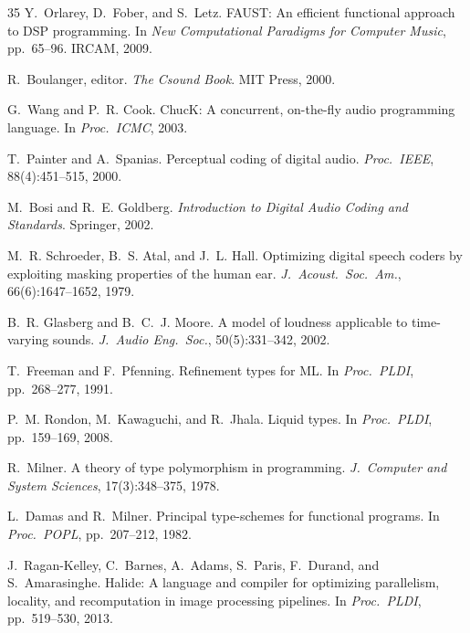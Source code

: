 \documentclass[sigchi, nonacm]{acmart}
\begin{document}
\begin{thebibliography}{35}
Y.~Orlarey, D.~Fober, and S.~Letz.
\newblock FAUST: An efficient functional approach to DSP programming.
\newblock In \emph{New Computational Paradigms for Computer Music}, pp.~65--96. IRCAM, 2009.

R.~Boulanger, editor.
\newblock \emph{The Csound Book}.
\newblock MIT Press, 2000.

G.~Wang and P.~R. Cook.
\newblock ChucK: A concurrent, on-the-fly audio programming language.
\newblock In \emph{Proc.\ ICMC}, 2003.

T.~Painter and A.~Spanias.
\newblock Perceptual coding of digital audio.
\newblock \emph{Proc.\ IEEE}, 88(4):451--515, 2000.

M.~Bosi and R.~E. Goldberg.
\newblock \emph{Introduction to Digital Audio Coding and Standards}.
\newblock Springer, 2002.

M.~R. Schroeder, B.~S. Atal, and J.~L. Hall.
\newblock Optimizing digital speech coders by exploiting masking properties of the human ear.
\newblock \emph{J.\ Acoust.\ Soc.\ Am.}, 66(6):1647--1652, 1979.

B.~R. Glasberg and B.~C.~J. Moore.
\newblock A model of loudness applicable to time-varying sounds.
\newblock \emph{J.\ Audio Eng.\ Soc.}, 50(5):331--342, 2002.

T.~Freeman and F.~Pfenning.
\newblock Refinement types for ML.
\newblock In \emph{Proc.\ PLDI}, pp.~268--277, 1991.

P.~M. Rondon, M.~Kawaguchi, and R.~Jhala.
\newblock Liquid types.
\newblock In \emph{Proc.\ PLDI}, pp.~159--169, 2008.

R.~Milner.
\newblock A theory of type polymorphism in programming.
\newblock \emph{J.\ Computer and System Sciences}, 17(3):348--375, 1978.

L.~Damas and R.~Milner.
\newblock Principal type-schemes for functional programs.
\newblock In \emph{Proc.\ POPL}, pp.~207--212, 1982.

J.~Ragan-Kelley, C.~Barnes, A.~Adams, S.~Paris, F.~Durand, and S.~Amarasinghe.
\newblock Halide: A language and compiler for optimizing parallelism, locality, and recomputation in image processing pipelines.
\newblock In \emph{Proc.\ PLDI}, pp.~519--530, 2013.


\end{thebibliography}
\end{document}
